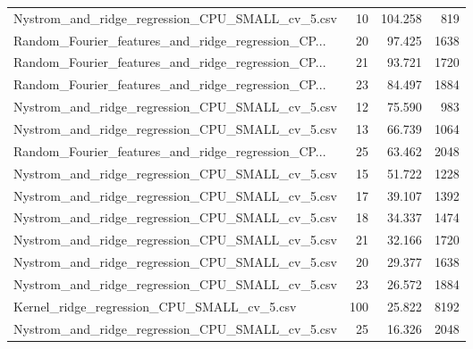 \begin{tabularx}{\textwidth}{lrrr}
   Nystrom\_and\_ridge\_regression\_CPU\_SMALL\_cv\_5.csv &       10 &  104.258 &           819 \\
Random\_Fourier\_features\_and\_ridge\_regression\_CP... &       20 &   97.425 &          1638 \\
Random\_Fourier\_features\_and\_ridge\_regression\_CP... &       21 &   93.721 &          1720 \\
Random\_Fourier\_features\_and\_ridge\_regression\_CP... &       23 &   84.497 &          1884 \\
   Nystrom\_and\_ridge\_regression\_CPU\_SMALL\_cv\_5.csv &       12 &   75.590 &           983 \\
   Nystrom\_and\_ridge\_regression\_CPU\_SMALL\_cv\_5.csv &       13 &   66.739 &          1064 \\
Random\_Fourier\_features\_and\_ridge\_regression\_CP... &       25 &   63.462 &          2048 \\
   Nystrom\_and\_ridge\_regression\_CPU\_SMALL\_cv\_5.csv &       15 &   51.722 &          1228 \\
   Nystrom\_and\_ridge\_regression\_CPU\_SMALL\_cv\_5.csv &       17 &   39.107 &          1392 \\
   Nystrom\_and\_ridge\_regression\_CPU\_SMALL\_cv\_5.csv &       18 &   34.337 &          1474 \\
   Nystrom\_and\_ridge\_regression\_CPU\_SMALL\_cv\_5.csv &       21 &   32.166 &          1720 \\
   Nystrom\_and\_ridge\_regression\_CPU\_SMALL\_cv\_5.csv &       20 &   29.377 &          1638 \\
   Nystrom\_and\_ridge\_regression\_CPU\_SMALL\_cv\_5.csv &       23 &   26.572 &          1884 \\
        Kernel\_ridge\_regression\_CPU\_SMALL\_cv\_5.csv &      100 &   25.822 &          8192 \\
   Nystrom\_and\_ridge\_regression\_CPU\_SMALL\_cv\_5.csv &       25 &   16.326 &          2048 \\
\bottomrule
\end{tabularx}
